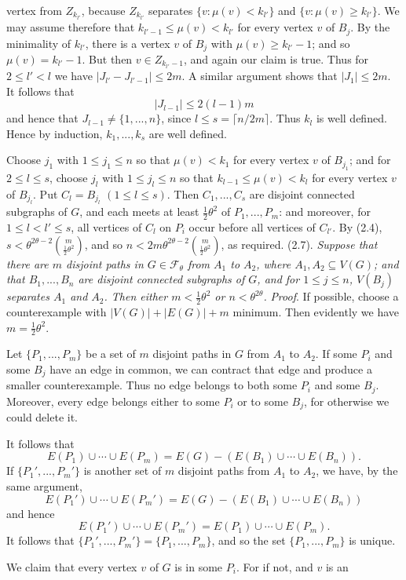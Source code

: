 \noindent vertex from $Z_{k_{l'}}$, because $Z_{k_{l'}}$ separates $\{v\colon\mu(v)<k_{l'}\}$ and $\{v\colon\mu(v)\ge k_{l'}\}$.
We may assume therefore that $k_{l'-1}\le\mu(v)<k_{l'}$ for every vertex $v$ of $B_j$. By
the minimality of $k_{l'}$, there is a vertex $v$ of $B_j$ with $\mu(v)\ge k_{l'}-1$; and so
$\mu(v)=k_{l'}-1$. But then $v\in Z_{k_{l'}-1}$, and again our claim is true. Thus for
$2\le l'<l$ we have $|J_{l'}-J_{l'-1}|\le 2m$. A similar argument shows that
$|J_1|\le 2m$. It follows that
\begin{equation*}
|J_{l-1}|\le 2(l-1)m
\end{equation*}
and hence that $J_{l-1}\ne\{1,..., n\}$, since $l\le s=\lceil n/2m\rceil$. Thus $k_l$ is well defined.
Hence by induction, $k_1,..., k_s$ are well defined.

Choose $j_1$ with $1\le j_1\le n$ so that $\mu(v)<k_1$ for every vertex $v$ of $B_{j_1}$; and
for $2\le l\le s$, choose $j_l$ with $1\le j_l\le n$ so that $k_{l-1}\le\mu(v)<k_l$ for every
vertex $v$ of $B_{j_l}$. Put $C_l=B_{j_l}$ $(1\le l\le s)$. Then $C_1,..., C_s$ are disjoint connected
subgraphs of $G$, and each meets at least $\frac12\theta^2$ of $P_1,..., P_m$: and moreover, for
$1\le l<l'\le s$, all vertices of $C_l$ on $P_i$ occur before all vertices of $C_{l'}$. By
(2.4), $s<\theta^{2\theta-2}\binom{m}{\frac12\theta^2}$, and so $n<2m\theta^{2\theta-2}\binom{m}{\frac12\theta^2}$, as required.
\stmt
(2.7). \textit{Suppose that there are $m$ disjoint paths in $G\in\mathscr{F}_\theta$ from $A_1$ to $A_2$,
where $A_1, A_2\subseteq V(G)$; and that $B_1,..., B_n$ are disjoint connected subgraphs of
$G$, and for $1\le j\le n$, $V(B_j)$ separates $A_1$ and $A_2$. Then either $m<\frac12\theta^2$ or
$n<\theta^{2\theta}$.}
\stmt
\textit{Proof}. If possible, choose a counterexample with $|V(G)|+|E(G)|+m$
minimum. Then evidently we have $m=\frac12\theta^2$.

Let $\{P_1,..., P_m\}$ be a set of $m$ disjoint paths in $G$ from $A_1$ to $A_2$. If some $P_i$
and some $B_j$ have an edge in common, we can contract that edge and
produce a smaller counterexample. Thus no edge belongs to both some $P_i$
and some $B_j$. Moreover, every edge belongs either to some $P_i$ or to some $B_j$,
for otherwise we could delete it.

It follows that
\begin{equation*}
E(P_1)\cup\cdots\cup E(P_m)=E(G)-(E(B_1)\cup\cdots\cup E(B_n)).
\end{equation*}
If $\{P_1',..., P_m'\}$ is another set of $m$ disjoint paths from $A_1$ to $A_2$, we have, by
the same argument,
\begin{equation*}
E(P_1')\cup\cdots\cup E(P_m')=E(G)-(E(B_1)\cup\cdots\cup E(B_n))
\end{equation*}
and hence
\begin{equation*}
E(P_1')\cup\cdots\cup E(P_m')=E(P_1)\cup\cdots\cup E(P_m).
\end{equation*}
It follows that $\{P_1',..., P_m'\}=\{P_1,..., P_m\}$, and so the set $\{P_1,..., P_m\}$ is unique.

We claim that every vertex $v$ of $G$ is in some $P_i$. For if not, and $v$ is an

